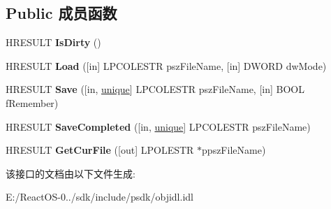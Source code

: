 \subsection*{Public 成员函数}
\begin{DoxyCompactItemize}
\item 
\mbox{\label{interface_i_persist_file_afa6a3c2cc8eb546a26147a845f2ab659}} 
H\+R\+E\+S\+U\+LT {\bfseries Is\+Dirty} ()
\item 
\mbox{\label{interface_i_persist_file_a6034590adcd1e6c1aafd2d45b9a0cc7d}} 
H\+R\+E\+S\+U\+LT {\bfseries Load} (\mbox{[}in\mbox{]} L\+P\+C\+O\+L\+E\+S\+TR psz\+File\+Name, \mbox{[}in\mbox{]} D\+W\+O\+RD dw\+Mode)
\item 
\mbox{\label{interface_i_persist_file_a37f345f12637f616bc14004ee65a84db}} 
H\+R\+E\+S\+U\+LT {\bfseries Save} (\mbox{[}in, \hyperlink{interfaceunique}{unique}\mbox{]} L\+P\+C\+O\+L\+E\+S\+TR psz\+File\+Name, \mbox{[}in\mbox{]} B\+O\+OL f\+Remember)
\item 
\mbox{\label{interface_i_persist_file_a05562f5d8851e4c156371d8ac2934863}} 
H\+R\+E\+S\+U\+LT {\bfseries Save\+Completed} (\mbox{[}in, \hyperlink{interfaceunique}{unique}\mbox{]} L\+P\+C\+O\+L\+E\+S\+TR psz\+File\+Name)
\item 
\mbox{\label{interface_i_persist_file_a4e0f75d94d48a6d5da60149bf3212c1f}} 
H\+R\+E\+S\+U\+LT {\bfseries Get\+Cur\+File} (\mbox{[}out\mbox{]} L\+P\+O\+L\+E\+S\+TR $\ast$ppsz\+File\+Name)
\end{DoxyCompactItemize}


该接口的文档由以下文件生成\+:\begin{DoxyCompactItemize}
\item 
E\+:/\+React\+O\+S-\/0../sdk/include/psdk/objidl.\+idl\end{DoxyCompactItemize}
